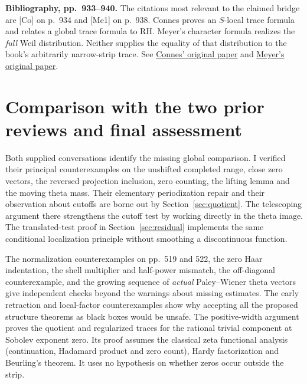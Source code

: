 \documentclass[11pt,letterpaper]{article}
\newcommand{\head}[1]{\par\smallskip\textbf{#1}\enspace}
\begin{document}
\head{Bibliography, pp.~933--940.}
The citations most relevant to the claimed bridge are [Co] on p.~934 and [Me1] on p.~938. Connes proves an $S$-local trace formula and relates a global trace formula to RH. Meyer's character formula realizes the \emph{full} Weil distribution. Neither supplies the equality of that distribution to the book's arbitrarily narrow-strip trace. See \href{https://arxiv.org/abs/math/9811068}{Connes' original paper} and \href{https://arxiv.org/abs/math/0311468}{Meyer's original paper}.

\clearpage
\section{Comparison with the two prior reviews and final assessment}\label{sec:earlier}

Both supplied conversations identify the missing global comparison. I verified their principal counterexamples on the unshifted completed range, close zero vectors, the reversed projection inclusion, zero counting, the lifting lemma and the moving theta mass. Their elementary periodization repair and their observation about cutoffs are borne out by Section~\ref{sec:quotient}. The telescoping argument there strengthens the cutoff test by working directly in the theta image. The translated-test proof in Section~\ref{sec:residual} implements the same conditional localization principle without smoothing a discontinuous function.

The normalization counterexamples on pp.~519 and 522, the zero Haar indentation, the shell multiplier and half-power mismatch, the off-diagonal counterexample, and the growing sequence of \emph{actual} Paley--Wiener theta vectors give independent checks beyond the warnings about missing estimates. The early retraction and local-factor counterexamples show why accepting all the proposed structure theorems as black boxes would be unsafe. The positive-width argument proves the quotient and regularized traces for the rational trivial component at Sobolev exponent zero. Its proof assumes the classical zeta functional analysis (continuation, Hadamard product and zero count), Hardy factorization and Beurling's theorem. It uses no hypothesis on whether zeros occur outside the strip.
\end{document}

